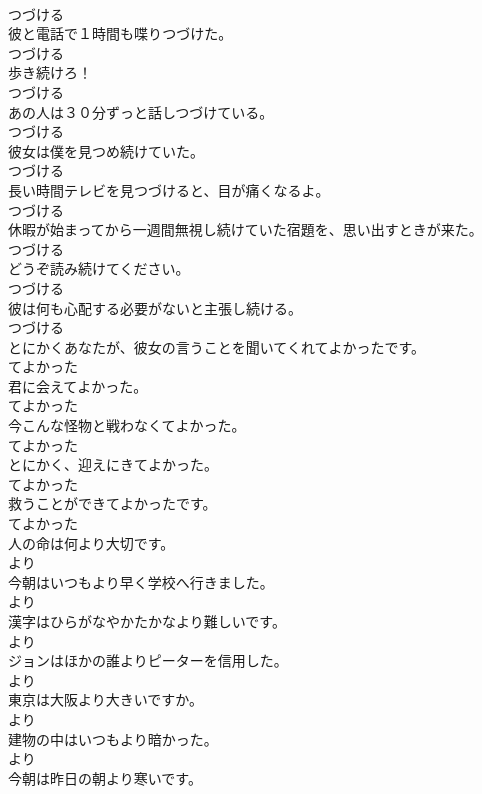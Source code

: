 \documentclass[8pt]{extreport}
\begin{document}
\begin{CJK}{UTF8}{min}
\\	つづける
\\	彼と電話で１時間も喋りつづけた。	
\\	つづける
\\	歩き続けろ！	
\\	つづける
\\	あの人は３０分ずっと話しつづけている。	
\\	つづける
\\	彼女は僕を見つめ続けていた。	
\\	つづける
\\	長い時間テレビを見つづけると、目が痛くなるよ。	
\\	つづける
\\	休暇が始まってから一週間無視し続けていた宿題を、思い出すときが来た。	
\\	つづける
\\	どうぞ読み続けてください。	
\\	つづける
\\	彼は何も心配する必要がないと主張し続ける。	
\\	つづける
\\	とにかくあなたが、彼女の言うことを聞いてくれてよかったです。	
\\	てよかった
\\	君に会えてよかった。	
\\	てよかった
\\	今こんな怪物と戦わなくてよかった。	
\\	てよかった
\\	とにかく、迎えにきてよかった。	
\\	てよかった
\\	救うことができてよかったです。	
\\	てよかった
\\	人の命は何より大切です。	
\\	より
\\	今朝はいつもより早く学校へ行きました。	
\\	より
\\	漢字はひらがなやかたかなより難しいです。	
\\	より
\\	ジョンはほかの誰よりピーターを信用した。	
\\	より
\\	東京は大阪より大きいですか。	
\\	より
\\	建物の中はいつもより暗かった。	
\\	より
\\	今朝は昨日の朝より寒いです。	

\end{CJK}
\end{document}
